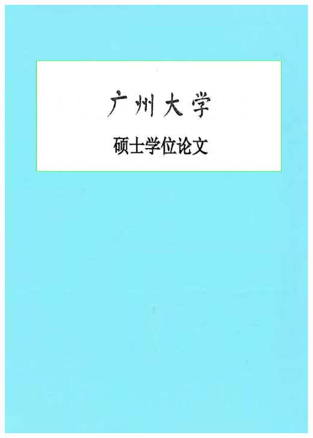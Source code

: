 \begin{titlepage}
\centerline{\includegraphics[scale=1.0]{logo/Signature.pdf}} %
\end{titlepage}
\newpage
